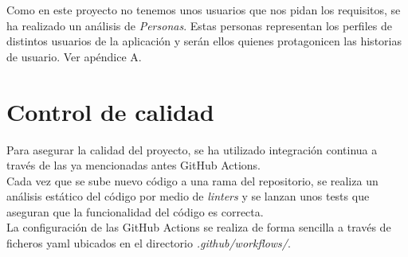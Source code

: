 
Como en este proyecto no tenemos unos usuarios que nos pidan los requisitos, se ha realizado un análisis de \textit{Personas}\cite{personas}. Estas personas representan los perfiles de distintos usuarios de la aplicación y serán ellos quienes protagonicen las historias de usuario. Ver apéndice A.


\section{Control de calidad}
Para asegurar la calidad del proyecto, se ha utilizado integración continua a través de las ya mencionadas antes GitHub Actions.\\

Cada vez que se sube nuevo código a una rama del repositorio, se realiza un análisis estático del código por medio de \textit{linters} y se lanzan unos tests que aseguran que la funcionalidad del código es correcta.\\

La configuración de las GitHub Actions se realiza de forma sencilla a través de ficheros yaml ubicados en el directorio \textit{.github/workflows/}.\\



